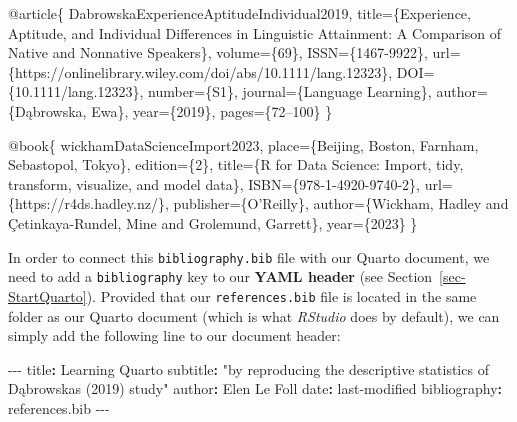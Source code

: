 \documentclass[
  letterpaper,
  DIV=11,
  numbers=noendperiod]{scrreprt}
\newenvironment{Shaded}{\begin{snugshade}}{\end{snugshade}}
\newcommand{\AttributeTok}[1]{\textcolor[rgb]{0.40,0.45,0.13}{#1}}
\newcommand{\DataTypeTok}[1]{\textcolor[rgb]{0.68,0.00,0.00}{#1}}
\newcommand{\FunctionTok}[1]{\textcolor[rgb]{0.28,0.35,0.67}{#1}}
\newcommand{\KeywordTok}[1]{\textcolor[rgb]{0.00,0.23,0.31}{\textbf{#1}}}
\newcommand{\NormalTok}[1]{\textcolor[rgb]{0.00,0.23,0.31}{#1}}
\newcommand{\OtherTok}[1]{\textcolor[rgb]{0.00,0.23,0.31}{#1}}
\newcommand{\PreprocessorTok}[1]{\textcolor[rgb]{0.68,0.00,0.00}{#1}}
\newcommand{\StringTok}[1]{\textcolor[rgb]{0.13,0.47,0.30}{#1}}
\newcommand{\VariableTok}[1]{\textcolor[rgb]{0.07,0.07,0.07}{#1}}
\begin{document}
\begin{Shaded}
\begin{Highlighting}[]
\VariableTok{@article}\NormalTok{\{}
  \OtherTok{DabrowskaExperienceAptitudeIndividual2019}\NormalTok{,}
  \DataTypeTok{title}\NormalTok{=\{Experience, Aptitude, and Individual Differences in Linguistic Attainment: A Comparison of Native and Nonnative Speakers\},}
  \DataTypeTok{volume}\NormalTok{=\{69\},}
  \DataTypeTok{ISSN}\NormalTok{=\{1467{-}9922\},}
  \DataTypeTok{url}\NormalTok{=\{https://onlinelibrary.wiley.com/doi/abs/10.1111/lang.12323\},}
  \DataTypeTok{DOI}\NormalTok{=\{10.1111/lang.12323\},}
  \DataTypeTok{number}\NormalTok{=\{S1\},}
  \DataTypeTok{journal}\NormalTok{=\{Language Learning\},}
  \DataTypeTok{author}\NormalTok{=\{Dąbrowska, Ewa\},}
  \DataTypeTok{year}\NormalTok{=\{2019\},}
  \DataTypeTok{pages}\NormalTok{=\{72–100\}}
\NormalTok{\}}

\VariableTok{@book}\NormalTok{\{}
  \OtherTok{wickhamDataScienceImport2023}\NormalTok{,}
  \DataTypeTok{place}\NormalTok{=\{Beijing, Boston, Farnham, Sebastopol, Tokyo\},}
  \DataTypeTok{edition}\NormalTok{=\{2\},}
  \DataTypeTok{title}\NormalTok{=\{R for Data Science: Import, tidy, transform, visualize, and model data\},}
  \DataTypeTok{ISBN}\NormalTok{=\{978{-}1{-}4920{-}9740{-}2\},}
  \DataTypeTok{url}\NormalTok{=\{https://r4ds.hadley.nz/\},}
  \DataTypeTok{publisher}\NormalTok{=\{O’Reilly\},}
  \DataTypeTok{author}\NormalTok{=\{Wickham, Hadley and Çetinkaya{-}Rundel, Mine and Grolemund, Garrett\},}
  \DataTypeTok{year}\NormalTok{=\{2023\} }
\NormalTok{\}}
\end{Highlighting}
\end{Shaded}

In order to connect this \texttt{bibliography.bib} file with our Quarto
document, we need to add a \texttt{bibliography} key to our \textbf{YAML
header} (see Section~\ref{sec-StartQuarto}). Provided that our
\texttt{references.bib} file is located in the same folder as our Quarto
document (which is what \emph{RStudio} does by default), we can simply
add the following line to our document header:

\begin{Shaded}
\begin{Highlighting}[]
\PreprocessorTok{{-}{-}{-} }
\FunctionTok{title}\KeywordTok{:}\AttributeTok{ Learning Quarto}
\FunctionTok{subtitle}\KeywordTok{:}\AttributeTok{ }\StringTok{"by reproducing the descriptive statistics of Dąbrowska\textquotesingle{}s (2019) study"}
\FunctionTok{author}\KeywordTok{:}\AttributeTok{ Elen Le Foll}
\FunctionTok{date}\KeywordTok{:}\AttributeTok{ last{-}modified}
\FunctionTok{bibliography}\KeywordTok{:}\AttributeTok{ references.bib}
\PreprocessorTok{{-}{-}{-}}
\end{Highlighting}
\end{Shaded}
\end{document}
